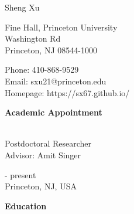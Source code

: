 \documentclass{article}
\begin{document}
\begin{Huge}
\noindent Sheng Xu
\end{Huge}

\vspace{5mm}
\begin{minipage}{0.5\linewidth}
  \flushleft
{} Fine Hall, Princeton University \\
\noindent Washington Rd \\
\noindent Princeton, NJ 08544-1000
\end{minipage}
\hfill
\begin{minipage}{0.35\linewidth}
  Phone: 410-868-9529 \\
  Email: sxu21@princeton.edu \\
  Homepage: https://sx67.github.io/
\end{minipage}

\vspace{5mm}
\begin{large}
\noindent \textbf{Academic Appointment}
\end{large}
\vspace{5mm}

\begin{minipage}{0.65\linewidth}
\\
Postdoctoral Researcher\\
Advisor: Amit Singer\\
\end{minipage}\hfill
\begin{minipage}{0.34\linewidth}
 - present\\
Princeton, NJ, USA\\
\end{minipage}


\vspace{5mm}
\begin{large}
\noindent \textbf{Education}
\end{large}
\vspace{5mm}
\end{document}
